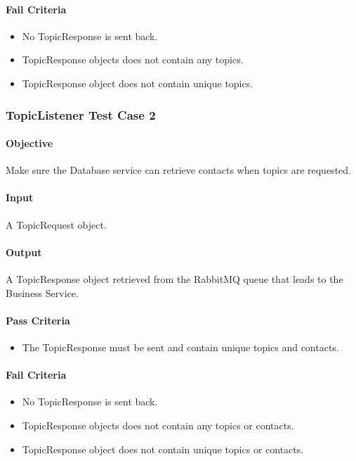 \documentclass[hidelinks,english]{article}
\begin{document}
			\paragraph{Fail Criteria}
			\begin{itemize}
				\item No TopicResponse is sent back.
				\item TopicResponse objects does not contain any topics.
				\item TopicResponse object does not contain unique topics.
			\end{itemize}
			
		\subsubsection{TopicListener Test Case 2}\label{databasetopiclistenertest2}
			\paragraph{Objective} Make sure the Database service can retrieve contacts when topics are requested.
			\paragraph{Input} A TopicRequest object.
			\paragraph{Output} A TopicResponse object retrieved from the RabbitMQ queue that leads to the Business Service.
			\paragraph{Pass Criteria}
			\begin{itemize}
				\item The TopicResponse must be sent and contain unique topics and contacts.
			\end{itemize}
			\paragraph{Fail Criteria}
			\begin{itemize}
				\item No TopicResponse is sent back.
				\item TopicResponse objects does not contain any topics or contacts.
				\item TopicResponse object does not contain unique topics or contacts.
			\end{itemize}
			
\end{document}
